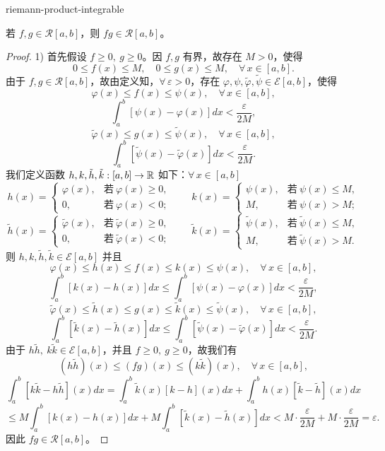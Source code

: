 \begin{mythm}{}{riemann-product-integrable}

	若 \(f,g\in\mathscr{R}[a,b]\)，则 \(fg\in\mathscr{R}[a,b]\)。

\end{mythm}

\begin{proof}

	1) 首先假设 \(f\ge0,\ g\ge0\)。因 \(f,g\) 有界，故存在 \(M>0\)，使得
	\[
	0\le f(x)\le M,\quad 0\le g(x)\le M,\quad\forall\,x\in[a,b].
	\]
	由于 \(f,g\in\mathscr{R}[a,b]\)，故由定义知，\(\forall\,\varepsilon>0\)，存在 \(\varphi,\psi,\tilde\varphi,\tilde\psi\in\mathscr{E}[a,b]\)，使得
	\[
	\varphi(x)\le f(x)\le\psi(x),\quad\forall\,x\in[a,b],
	\]
	\[
	\int_a^b[\psi(x)-\varphi(x)]dx<\frac{\varepsilon}{2M},
	\]
	\[
	\tilde\varphi(x)\le g(x)\le\tilde\psi(x),\quad\forall\,x\in[a,b],
	\]
	\[
	\int_a^b[\tilde\psi(x)-\tilde\varphi(x)]dx<\frac{\varepsilon}{2M}.
	\]
	我们定义函数 \(h,k,\tilde h,\tilde k:[a,b]\to\mathbb{R}\) 如下：\(\forall\,x\in[a,b]\)
	\[
	h(x)=\begin{cases} \varphi(x), & \text{若}\ \varphi(x)\ge0, \\ 0, & \text{若}\ \varphi(x)<0; \end{cases}
	\qquad
	k(x)=\begin{cases} \psi(x), & \text{若}\ \psi(x)\le M, \\ M, & \text{若}\ \psi(x)>M; \end{cases}
	\]
	\[
	\tilde h(x)=\begin{cases} \tilde\varphi(x), & \text{若}\ \tilde\varphi(x)\ge0, \\ 0, & \text{若}\ \tilde\varphi(x)<0; \end{cases}
	\qquad
	\tilde k(x)=\begin{cases} \tilde\psi(x), & \text{若}\ \tilde\psi(x)\le M, \\ M, & \text{若}\ \tilde\psi(x)>M. \end{cases}
	\]
	则 \(h,k,\tilde h,\tilde k\in\mathscr{E}[a,b]\) 并且
	\[
	\varphi(x)\le h(x)\le f(x)\le k(x)\le\psi(x),\quad\forall\,x\in[a,b],
	\]
	\[
	\int_a^b[k(x)-h(x)]dx\le\int_a^b[\psi(x)-\varphi(x)]dx<\frac{\varepsilon}{2M},
	\]
	\[
	\tilde\varphi(x)\le\tilde h(x)\le g(x)\le\tilde k(x)\le\tilde\psi(x),\quad\forall\,x\in[a,b],
	\]
	\[
	\int_a^b[\tilde k(x)-\tilde h(x)]dx\le\int_a^b[\tilde\psi(x)-\tilde\varphi(x)]dx<\frac{\varepsilon}{2M}.
	\]
	由于 \(h\tilde h,\ k\tilde k\in\mathscr{E}[a,b]\)，并且 \(f\ge0,\ g\ge0\)，故我们有
	\[
	(h\tilde h)(x)\le(fg)(x)\le(k\tilde k)(x),\quad\forall\,x\in[a,b],
	\]
	\[
	\int_a^b[k\tilde k-h\tilde h](x)dx=\int_a^b\tilde k(x)[k-h](x)dx+\int_a^b h(x)[\tilde k-\tilde h](x)dx
	\]
	\[
	\le M\int_a^b[k(x)-h(x)]dx+M\int_a^b[\tilde k(x)-\tilde h(x)]dx<M\cdot\frac{\varepsilon}{2M}+M\cdot\frac{\varepsilon}{2M}=\varepsilon.
	\]
	因此 \(fg\in\mathscr{R}[a,b]\)。


\end{proof}
